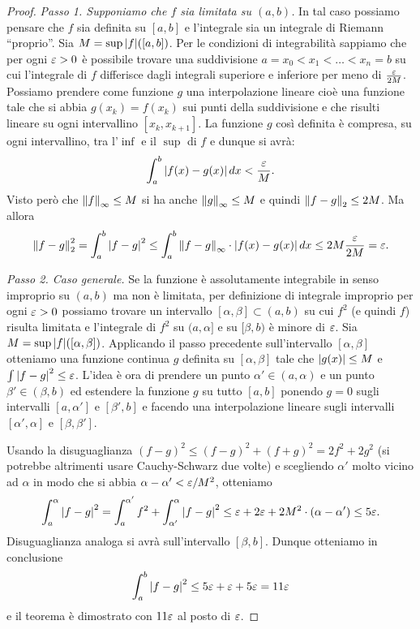 \begin{proof}
\emph{Passo 1. Supponiamo che $f$ sia limitata su $(a,b)$.}
In tal caso possiamo pensare che $f$ sia definita su $[a,b]$
e l'integrale sia un integrale di Riemann ``proprio''.
Sia $M=\sup {\left|f\right|}([a,b])$.
Per le condizioni di integrabilità sappiamo che per ogni $\varepsilon>0$ è possibile
trovare una suddivisione $a=x_0 < x_1 < \dots < x_n =b$ su cui l'integrale
di $f$ differisce dagli integrali superiore e inferiore per meno di $\frac{\varepsilon}{2M}$.
Possiamo prendere come funzione $g$ una interpolazione lineare
cioè una funzione tale che si abbia $g(x_k) = f(x_k)$ sui punti della suddivisione
e che risulti lineare su ogni intervallino $[x_k,x_{k+1}]$. La funzione
$g$ così definita è compresa, su ogni intervallino, tra l'$\inf$ e il $\sup$
di $f$ e dunque si avrà:
\[
 \int_a^b {\left|f(x)-g(x)\right|}\, dx < \frac{\varepsilon}{M}.
\]
Visto però che ${\left\Vert f\right\Vert}_\infty\le M$
si ha anche ${\left\Vert g\right\Vert}_\infty\le M$ e quindi ${\left\Vert f-g\right\Vert}_2\le 2M$.
Ma allora
\[
  {\left\Vert f-g\right\Vert}_2^2 = \int_a^b {\left|f-g\right|}^2
  \le \int_a^b {\left\Vert f-g\right\Vert}_\infty \cdot {\left|f(x)-g(x)\right|}\, dx
  \le 2M \frac{\varepsilon}{2M} = \varepsilon.
\]

\emph{Passo 2. Caso generale.}
Se la funzione è assolutamente 
integrabile in senso improprio su $(a,b)$ ma non è limitata, per
definizione di integrale improprio per ogni $\varepsilon>0$ possiamo trovare un intervallo
$[\alpha,\beta]\subset (a,b)$
su cui $f^2$ (e quindi $f$) risulta limitata e
l'integrale di $f^2$ su $(a,\alpha]$ e su $[\beta,b)$
è minore di $\varepsilon$. 
Sia $M=\sup {\left|f\right|}([\alpha,\beta])$.
Applicando il passo precedente sull'intervallo $[\alpha,\beta]$ 
otteniamo una funzione continua $g$ definita su $[\alpha,\beta]$ 
tale che ${\left|g(x)\right|}\le M$
e $\int{\left|f-g\right|}^2\le \varepsilon$.
L'idea è ora di prendere un punto $\alpha'\in(a,\alpha)$ 
e un punto $\beta'\in(\beta,b)$ ed estendere la funzione 
$g$ su tutto $[a,b]$ ponendo $g=0$ sugli intervalli 
$[a,\alpha']$ e $[\beta',b]$ e facendo una interpolazione 
lineare sugli intervalli $[\alpha',\alpha]$ e $[\beta,\beta']$.

Usando la disuguaglianza 
$(f-g)^2 \le (f-g)^2+(f+g)^2 = 2f^2+2g^2$
(si potrebbe altrimenti usare Cauchy-Schwarz due volte)
e scegliendo $\alpha'$ molto vicino ad 
$\alpha$ in modo che si abbia $\alpha-\alpha'<\varepsilon/M^2$,
otteniamo
\[
  \int_a^\alpha {\left|f-g\right|}^2 
  = \int_a^{\alpha'} f^2 + \int_{\alpha'}^\alpha {\left|f-g\right|}^2
  \le \varepsilon + 2\varepsilon + 2M^2\cdot(\alpha-\alpha')
  \le 5\varepsilon.
\]
Disuguaglianza analoga si avrà sull'intervallo $[\beta,b]$.
Dunque otteniamo in conclusione 
\[
\int_a^b {\left|f-g\right|}^2
\le 5\varepsilon + \varepsilon + 5\varepsilon  = 11 \varepsilon
\]
e il teorema è dimostrato con $11\varepsilon$ al posto di $\varepsilon$.
\end{proof}

